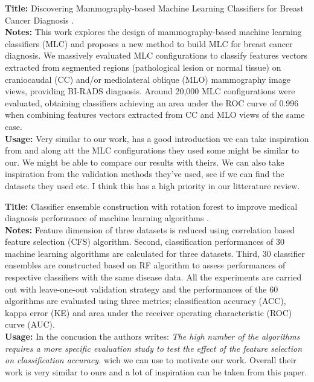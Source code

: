 \documentclass[a4paper]{article}
\begin{document}
\noindent
\textbf{Title:} Discovering Mammography-based Machine Learning Classifiers for Breast Cancer Diagnosis \cite{ramos2012}.
\\
\textbf{Notes:} This work explores the design of mammography-based machine learning classifiers (MLC) and proposes a new method to build MLC for breast cancer diagnosis. We massively evaluated MLC configurations to classify features vectors extracted from segmented regions (pathological lesion or normal tissue) on craniocaudal (CC) and/or mediolateral oblique (MLO) mammography image views, providing BI-RADS diagnosis. Around 20,000 MLC configurations were evaluated, obtaining classifiers achieving an area under the ROC curve of 0.996 when combining features vectors extracted from CC and MLO views of the same case.
\\
\textbf{Usage:} Very similar to our work, has a good introduction we can take inspiration from and along att the MLC configurations they used some might be similar to our. We might be able to compare our results with theirs. We can also take inspiration from the validation methods they've used, see if we can find the datasets they used etc. I think this has a high priority in our litterature review.
\\\par

\noindent
\textbf{Title:} Classifier ensemble construction with rotation forest to improve medical diagnosis performance of machine learning algorithms \cite{akin2011}.
\\
\textbf{Notes:} Feature dimension of three datasets is reduced using correlation based feature selection (CFS) algorithm. Second, classification performances of 30 machine learning algorithms are calculated for three datasets. Third, 30 classifier ensembles are constructed based on RF algorithm to assess performances of respective classifiers with the same disease data. All the experiments are carried out with leave-one-out validation strategy and the performances of the 60 algorithms are evaluated using three metrics; classification accuracy (ACC), kappa error (KE) and area under the receiver operating characteristic (ROC) curve (AUC).
\\
\textbf{Usage:} In the concusion the authors writes: \textit{The high number of the algorithms requires a more specific evaluation study to test the effect of the feature selection on classification accuracy.} wich we can use to motivate our work. Overall their work is very similar to ours and a lot of inspiration can be taken from this paper.
\\\par
\end{document}
